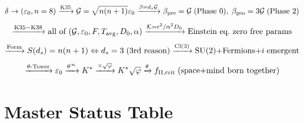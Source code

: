 \documentclass[12pt, a4paper]{article}
\begin{document}
\[
  \delta \to (\varepsilon_0, n=8) \xrightarrow{\rm K35}\mathcal{G}=\sqrt{n(n+1)}\varepsilon_0
  \xrightarrow{\beta=d_s\mathcal{G}} \beta_{\rm pre}=\mathcal{G}\;\text{(Phase 0)},\;
  \beta_{\rm geo}=3\mathcal{G}\;\text{(Phase 2)}
\]
\[
  \xrightarrow{\rm K35-K38} \text{all of }(\mathcal{G},\varepsilon_0,F,T_{\rm avg},D_0,\alpha)
  \xrightarrow{\mathcal{K}=c^2/\alpha^2 D_0} \text{Einstein eq.\ zero free params}
\]
\[
  \xrightarrow{\rm Form} S(d_s)=n(n+1)\Leftrightarrow d_s=3\;\text{(3rd reason)}
  \xrightarrow{\rm Cl(3)} \text{SU(2)+Fermions+}i\;\text{emergent}
\]
\[
  \xrightarrow{\theta\text{-Tower}} \varepsilon_0\xrightarrow{\theta^\infty}K^*
  \xrightarrow{\times\sqrt{\varphi}}K^*\sqrt{\varphi}\xrightarrow{\theta}f_{\rm II,crit}
  \;\text{(space+mind born together)}
\]

\section{Master Status Table}
\end{document}
